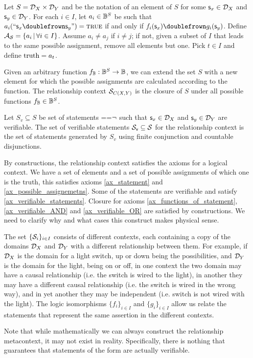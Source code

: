 \documentclass[11pt,letterpaper,fleqn]{memoir} %
\begin{document}
\begin{mathSection}
\begin{defn}
	Let $S = \mathcal{D}_{X} \times \mathcal{D}_{Y}$ and  be the notation of an element of $S$ for some $\mathsf{s}_x \in \mathcal{D}_{X}$ and $\mathsf{s}_y \in \mathcal{D}_{Y}$. For each $i \in I$, let $a_i \in \mathbb{B}^S$ be such that  $a_i(``\stmt_x \comp \stmt_y") = \TRUE$ if and only if $f_{i}(\stmt_x) \comp g_{i}(\stmt_y)$. Define $\mathcal{A}_{\mathcal{S}} = \{ a_i \, | \, \forall i \in I \}$. Assume $a_i \neq a_j$ if $i \neq j$; if not, given a subset of $I$ that leads to the same possible assignment, remove all elements but one. Pick $t \in I$ and define $\operatorname{truth} = a_t$.
	
	Given an arbitrary function $f_{\mathbb{B}} : \mathbb{B}^S \to \mathbb{B}$, we can extend the set $S$ with a new element for which the possible assignments are calculated according to the function. The relationship context $\mathcal{S}_{C(X,Y)}$ is the closure of $S$ under all possible functions $f_{\mathbb{B}} \in \mathbb{B}^S$.
	
	Let $S_v \subseteq S$ be set of statements ==$\neg$ such that $\mathsf{s}_x \in \mathcal{D}_{X}$ and $\mathsf{s}_y \in \mathcal{D}_{Y}$ are verifiable. The set of verifiable statements $\mathcal{S}_\textsf{v} \subseteq \mathcal{S}$ for the relationship context is the set of statements generated by $S_v$ using finite conjunction and countable disjunctions.
\end{defn}
\begin{justification}
	By constructions, the relationship context satisfies the axioms for a logical context. We have a set of elements and a set of possible assignments of which one is the truth, this satisfies axioms \ref{ax_statement} and \ref{ax_possible_assignemetns}. Some of the statements are verifiable and satisfy \ref{ax_verifiable_statements}. Closure for axioms \ref{ax_functions_of_statement}, \ref{ax_verifiable_AND} and \ref{ax_verifiable_OR} are satisfied by constructions. We need to clarify why and what cases this construct makes physical sense.
	
	The set $\{ \mathcal{S}_i \}_{i \in I}$ consists of different contexts, each containing a copy of the domains $\mathcal{D}_X$ and $\mathcal{D}_Y$ with a different relationship between them. For example, if $\mathcal{D}_X$ is the domain for a light switch, up or down being the possibilities, and $\mathcal{D}_Y$ is the domain for the light, being on or off, in one context the two domain may have a causal relationship (i.e. the switch is wired to the light), in another they may have a different causal relationship (i.e. the switch is wired in the wrong way), and in yet another they may be independent (i.e. switch is not wired with the light). The logic isomorphisms $\{f_{i}\}_{i \in I}$ and $\{g_{i}\}_{i \in I}$ allow us relate the statements that represent the same  assertion in the different contexts.
	
	Note that while mathematically we can always construct the relationship metacontext, it may not exist in reality. Specifically, there is nothing that guarantees that statements of the form  are actually verifiable.
\end{justification}
\end{mathSection}
\end{document}
